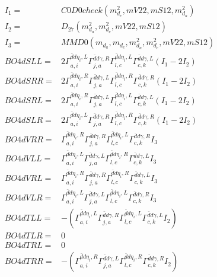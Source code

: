 \documentclass[A4,landscape]{article}
\begin{document}
\begin{align} 
I_1 = & C0D0check(m^2_{d_{{c}}}, mV22, mS12, m^2_{d_{{a}}}) \\ 
I_2 = & D_{27}(m^2_{d_{{a}}}, m^2_{d_{{c}}}, mV22, mS12) \\ 
I_3 = & MMD0(m_{d_{{a}}}, m_{d_{{c}}}, m^2_{d_{{a}}}, m^2_{d_{{c}}}, mV22, mS12) \\ 
  BO4dSLL= & 2  \Gamma^{\bar{d}d \eta_i ,L}_{a, i} \Gamma^{\bar{d}d \gamma ,R}_{j, a} \Gamma^{\bar{d}d \eta_i ,L}_{l, c} \Gamma^{\bar{d}d \gamma ,L}_{c, k} (I_1 - 2 I_2) \\ 
  BO4dSRR= & 2  \Gamma^{\bar{d}d \eta_i ,R}_{a, i} \Gamma^{\bar{d}d \gamma ,L}_{j, a} \Gamma^{\bar{d}d \eta_i ,R}_{l, c} \Gamma^{\bar{d}d \gamma ,R}_{c, k} (I_1 - 2 I_2) \\ 
  BO4dSRL= & 2  \Gamma^{\bar{d}d \eta_i ,R}_{a, i} \Gamma^{\bar{d}d \gamma ,L}_{j, a} \Gamma^{\bar{d}d \eta_i ,L}_{l, c} \Gamma^{\bar{d}d \gamma ,L}_{c, k} (I_1 - 2 I_2) \\ 
  BO4dSLR= & 2  \Gamma^{\bar{d}d \eta_i ,L}_{a, i} \Gamma^{\bar{d}d \gamma ,R}_{j, a} \Gamma^{\bar{d}d \eta_i ,R}_{l, c} \Gamma^{\bar{d}d \gamma ,R}_{c, k} (I_1 - 2 I_2) \\ 
  BO4dVRR= &  \Gamma^{\bar{d}d \eta_i ,R}_{a, i} \Gamma^{\bar{d}d \gamma ,R}_{j, a} \Gamma^{\bar{d}d \eta_i ,L}_{l, c} \Gamma^{\bar{d}d \gamma ,R}_{c, k} I_3 \\ 
  BO4dVLL= &  \Gamma^{\bar{d}d \eta_i ,L}_{a, i} \Gamma^{\bar{d}d \gamma ,L}_{j, a} \Gamma^{\bar{d}d \eta_i ,R}_{l, c} \Gamma^{\bar{d}d \gamma ,L}_{c, k} I_3 \\ 
  BO4dVRL= &  \Gamma^{\bar{d}d \eta_i ,R}_{a, i} \Gamma^{\bar{d}d \gamma ,R}_{j, a} \Gamma^{\bar{d}d \eta_i ,R}_{l, c} \Gamma^{\bar{d}d \gamma ,L}_{c, k} I_3 \\ 
  BO4dVLR= &  \Gamma^{\bar{d}d \eta_i ,L}_{a, i} \Gamma^{\bar{d}d \gamma ,L}_{j, a} \Gamma^{\bar{d}d \eta_i ,L}_{l, c} \Gamma^{\bar{d}d \gamma ,R}_{c, k} I_3 \\ 
  BO4dTLL= & -( \Gamma^{\bar{d}d \eta_i ,L}_{a, i} \Gamma^{\bar{d}d \gamma ,R}_{j, a} \Gamma^{\bar{d}d \eta_i ,L}_{l, c} \Gamma^{\bar{d}d \gamma ,L}_{c, k} I_2) \\ 
  BO4dTLR= & 0 \\ 
  BO4dTRL= & 0 \\ 
  BO4dTRR= & -( \Gamma^{\bar{d}d \eta_i ,R}_{a, i} \Gamma^{\bar{d}d \gamma ,L}_{j, a} \Gamma^{\bar{d}d \eta_i ,R}_{l, c} \Gamma^{\bar{d}d \gamma ,R}_{c, k} I_2) \\ 
\end{align} 
\end{document}
